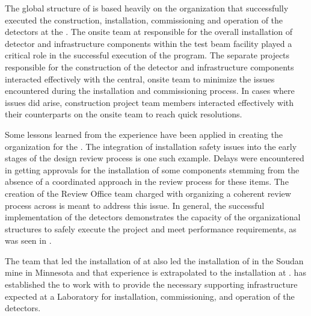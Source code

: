 The global structure of  is based heavily on 
the organization that successfully executed the construction,
installation, commissioning and operation of the 
detectors at the .  The onsite team at  
responsible for the overall installation of 
detector and infrastructure components within the test beam 
facility played a critical role in the successful execution of the 
 program.  The separate projects responsible for 
the construction of the detector and infrastructure components 
interacted effectively with the central, onsite team to minimize 
the issues encountered during the installation and commissioning 
process.  In cases where issues did arise, construction project 
team members interacted effectively with their counterparts on 
the onsite team to reach quick resolutions.

Some lessons learned from the  experience have been
applied in creating the  organization for the
 .  The integration of installation safety
issues into the early stages of the design review process is one such
example.  Delays were encountered in getting approvals for the
installation of some  components stemming from the absence
of a coordinated approach in the review process for these items.  The
creation of the  Review Office team charged with organizing a coherent
review process across  is meant to address this
issue.  In general, the successful implementation of the
 detectors demonstrates the capacity of the
organizational structures to safely execute the project and meet
performance requirements, as was seen in .

The team that led the installation of  at
 also led the installation of  in the Soudan
mine in Minnesota and that experience is extrapolated to the
installation at .  has established the
 to work with  to provide the necessary supporting
infrastructure expected at a Laboratory for installation,
commissioning, and operation of the  detectors.
